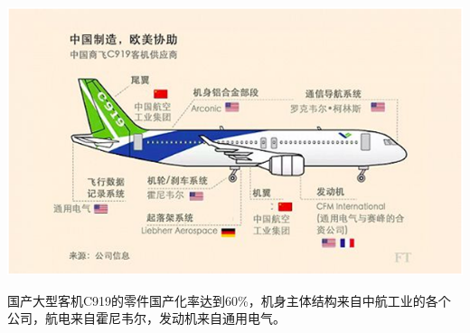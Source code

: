 \parbox{0.3\linewidth}{\includegraphics[clip=true,trim=40 0 40 0,width=\linewidth]{IMG/201912/20170511072434556.png}

\kaishu\quad\quad 国产大型客机C919的零件国产化率达到60\%，机身主体结构来自中航工业的各个公司，航电来自霍尼韦尔，发动机来自通用电气。\EOA}

\ADyixuehui



\newpage
{}

